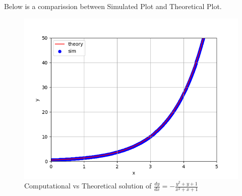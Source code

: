 \documentclass[journal]{IEEEtran}
\begin{document}
Below is a comparission between Simulated Plot and Theoretical Plot.
\begin{figure}[h!]
   \centering
   \includegraphics[width=1\columnwidth]{figs/fig.png}
   \caption{Computational vs Theoretical solution of $ \frac{dy}{dx}=-\frac{y^2+y+1}{x^2+x+1}$}
   \label{stemplot}
\end{figure}
\end{document}
